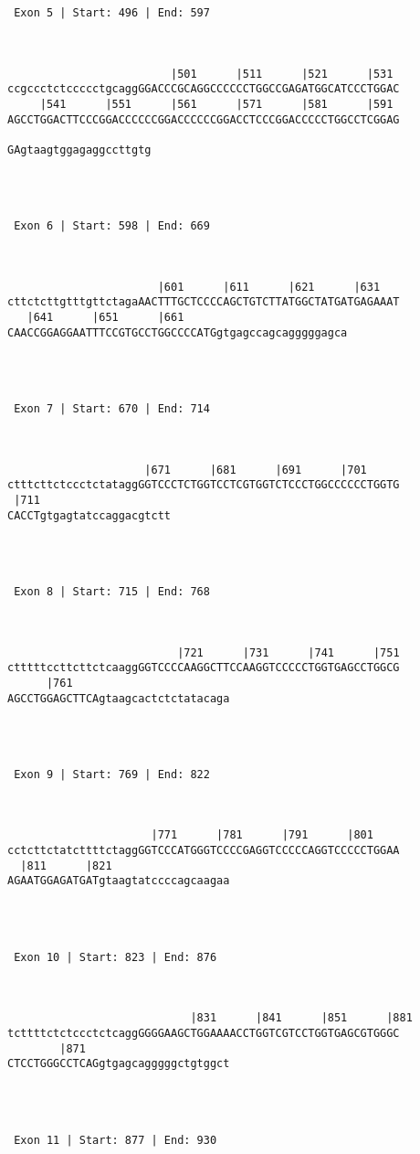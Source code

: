 \documentclass{article}
\begin{document}
\begin{Verbatim}
 Exon 5 | Start: 496 | End: 597 



                         |501      |511      |521      |531 
ccgccctctccccctgcaggGGACCCGCAGGCCCCCCTGGCCGAGATGGCATCCCTGGAC
     |541      |551      |561      |571      |581      |591 
AGCCTGGACTTCCCGGACCCCCCGGACCCCCCGGACCTCCCGGACCCCCTGGCCTCGGAG
                      
GAgtaagtggagaggccttgtg




 Exon 6 | Start: 598 | End: 669 



                       |601      |611      |621      |631   
cttctcttgtttgttctagaAACTTTGCTCCCCAGCTGTCTTATGGCTATGATGAGAAAT
   |641      |651      |661                         
CAACCGGAGGAATTTCCGTGCCTGGCCCCATGgtgagccagcagggggagca




 Exon 7 | Start: 670 | End: 714 



                     |671      |681      |691      |701     
ctttcttctccctctataggGGTCCCTCTGGTCCTCGTGGTCTCCCTGGCCCCCCTGGTG
 |711                    
CACCTgtgagtatccaggacgtctt




 Exon 8 | Start: 715 | End: 768 



                          |721      |731      |741      |751
ctttttccttcttctcaaggGGTCCCCAAGGCTTCCAAGGTCCCCCTGGTGAGCCTGGCG
      |761                        
AGCCTGGAGCTTCAgtaagcactctctatacaga




 Exon 9 | Start: 769 | End: 822 



                      |771      |781      |791      |801    
cctcttctatcttttctaggGGTCCCATGGGTCCCCGAGGTCCCCCAGGTCCCCCTGGAA
  |811      |821                  
AGAATGGAGATGATgtaagtatccccagcaagaa




 Exon 10 | Start: 823 | End: 876 



                            |831      |841      |851      |881
tcttttctctccctctcaggGGGGAAGCTGGAAAACCTGGTCGTCCTGGTGAGCGTGGGC
        |871                      
CTCCTGGGCCTCAGgtgagcagggggctgtggct




 Exon 11 | Start: 877 | End: 930 




\end{Verbatim}
\end{document}
